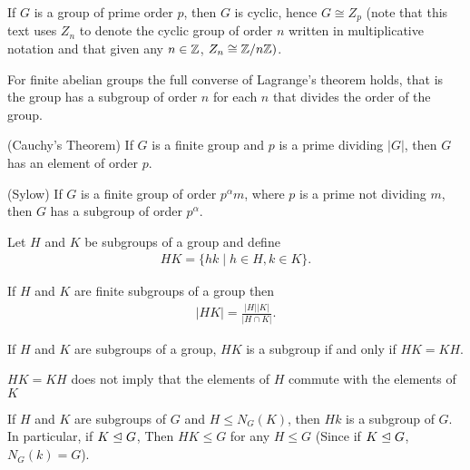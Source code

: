 \documentclass[../main]{subfiles}
\begin{document}
  
  \begin{cor}
   If $G$ is a group of prime order  $p$, then $G$ is cyclic, hence $G \cong Z_p$ (note that this text uses $Z_n$ to denote the cyclic group of order $n$ written in multiplicative notation and that given any $n\in \mathbb{Z}$, $Z_n \cong \mathbb{Z}/n\mathbb{Z})$.
  \end{cor}
  
  
  \begin{nt}
   For finite abelian groups the full converse of Lagrange's theorem holds, that is the group has a subgroup of order $n$ for each $n$ that divides the order of the group. 
  \end{nt}
  
  
  \begin{thm}
   (Cauchy's Theorem) If $G$ is a finite group and $p$ is a prime dividing $|G|$, then $G$ has an element of order $p$.
  \end{thm}
  
  
  \begin{thm}
   (Sylow) If $G$ is a finite group of order $p^\alpha m$, where $p$ is a prime not dividing $m$, then $G$ has a subgroup of order $p^\alpha$.
  \end{thm}
  
  
  \begin{dfn}
   Let $H$ and $K$ be subgroups of a group and define
   \begin{align*}
    HK = \{hk \mid h\in H, k\in K\}.
   \end{align*}
  \end{dfn}
  
  
  \begin{prop}
   If $H$ and $K$ are finite subgroups of a group then 
   \begin{align*}
    |HK|=\frac{|H||K|}{|H\cap K|}.
   \end{align*}
  \end{prop}
  
  
  \begin{prop}
   If $H$ and $K$ are subgroups of a group, $HK$ is a subgroup if and only if $HK=KH$.
  \end{prop}
  
  
  \begin{nt}
   $HK=KH$ does not imply that the elements of $H$ commute with the elements of $K$
  \end{nt}
  
  
  \begin{cor}
   If $H$ and $K$ are subgroups of $G$ and $H\leq N_G(K)$, then $Hk$ is a subgroup of $G$. In particular, if $K \trianglelefteq G$, Then $HK\leq G$ for any $H \leq G$ (Since if $K \trianglelefteq G$, $N_G(k)=G$).
  \end{cor}
  
\end{document}
